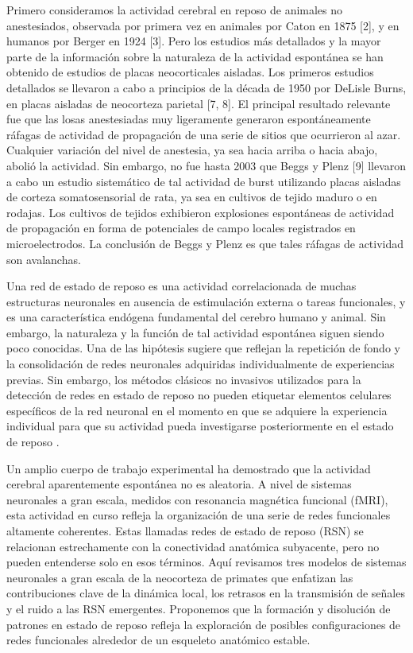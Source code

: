 Primero consideramos la actividad cerebral en reposo de animales no anestesiados, observada por primera vez en animales por Caton en 1875 [2], y en humanos por Berger en 1924 [3].  Pero los estudios más detallados y la mayor parte de la información sobre la naturaleza de la actividad espontánea se han obtenido de estudios de placas neocorticales aisladas. Los primeros estudios detallados se llevaron a cabo a principios de la década de 1950 por DeLisle Burns, en placas aisladas de neocorteza parietal [7, 8]. El principal resultado relevante fue que las losas anestesiadas muy ligeramente generaron espontáneamente ráfagas de actividad de propagación de una serie de sitios que ocurrieron al azar. Cualquier variación del nivel de anestesia, ya sea hacia arriba o hacia abajo, abolió la actividad.  Sin embargo, no fue hasta 2003 que Beggs y Plenz [9] llevaron a cabo un estudio sistemático de tal actividad de burst utilizando placas aisladas de corteza somatosensorial de rata, ya sea en cultivos de tejido maduro o en rodajas. Los cultivos de tejidos exhibieron explosiones espontáneas de actividad de propagación en forma de potenciales de campo locales registrados en microelectrodos.  La conclusión de Beggs y Plenz es que tales ráfagas de actividad son avalanchas. 








Una red de estado de reposo es una actividad correlacionada de muchas estructuras neuronales en ausencia de estimulación externa o tareas funcionales, y es una característica endógena fundamental del cerebro humano y animal. Sin embargo, la naturaleza y la función de tal actividad espontánea siguen siendo poco conocidas. Una de las hipótesis sugiere que reflejan la repetición de fondo y la consolidación de redes neuronales adquiridas individualmente de experiencias previas. Sin embargo, los métodos clásicos no invasivos utilizados para la detección de redes en estado de reposo no pueden etiquetar elementos celulares específicos de la red neuronal en el momento en que se adquiere la experiencia individual para que su actividad pueda investigarse posteriormente en el estado de reposo \cite{toropova_resting_2022}. 



Un amplio cuerpo de trabajo experimental ha demostrado que la actividad cerebral aparentemente espontánea no es aleatoria. A nivel de sistemas neuronales a gran escala, medidos con resonancia magnética funcional (fMRI), esta actividad en curso refleja la organización de una serie de redes funcionales altamente coherentes. Estas llamadas redes de estado de reposo (RSN) se relacionan estrechamente con la conectividad anatómica subyacente, pero no pueden entenderse solo en esos términos. Aquí revisamos tres modelos de sistemas neuronales a gran escala de la neocorteza de primates que enfatizan las contribuciones clave de la dinámica local, los retrasos en la transmisión de señales y el ruido a las RSN emergentes. Proponemos que la formación y disolución de patrones en estado de reposo refleja la exploración de posibles configuraciones de redes funcionales alrededor de un esqueleto anatómico estable.

